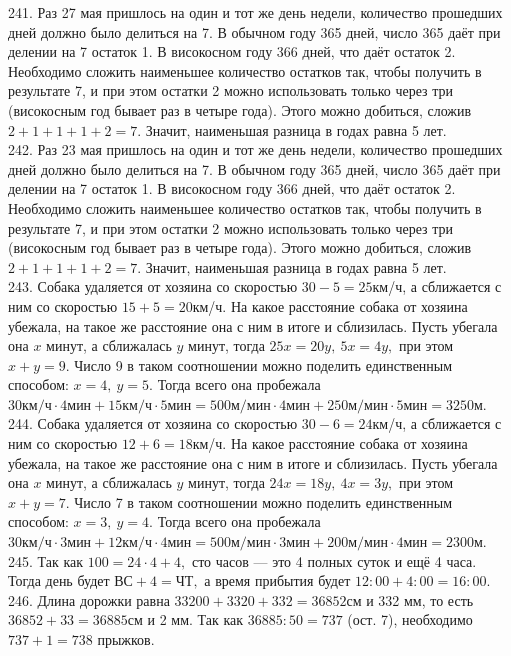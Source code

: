 \documentclass[12pt]{article}
\begin{document}
241. Раз 27 мая пришлось на один и тот же день недели, количество прошедших дней должно было делиться на 7. В обычном году 365 дней, число 365 даёт при делении на 7 остаток 1. В високосном году 366 дней, что даёт остаток 2. Необходимо сложить наименьшее количество остатков так, чтобы получить в результате 7, и при этом остатки 2 можно использовать только через три (високосным год бывает раз в четыре года). Этого можно добиться, сложив $2+1+1+1+2=7.$ Значит, наименьшая разница в годах равна 5 лет. \\
242. Раз 23 мая пришлось на один и тот же день недели, количество прошедших дней должно было делиться на 7. В обычном году 365 дней, число 365 даёт при делении на 7 остаток 1. В високосном году 366 дней, что даёт остаток 2. Необходимо сложить наименьшее количество остатков так, чтобы получить в результате 7, и при этом остатки 2 можно использовать только через три (високосным год бывает раз в четыре года). Этого можно добиться, сложив $2+1+1+1+2=7.$ Значит, наименьшая разница в годах равна 5 лет.\\
243. Собака удаляется от хозяина со скоростью $30-5=25$км/ч, а сближается с ним со скоростью $15+5=20$км/ч. На какое расстояние собака от хозяина убежала, на такое же расстояние она с ним в итоге и сблизилась. Пусть убегала она $x$ минут, а сближалась $y$ минут, тогда $25x=20y,\ 5x=4y,$ при этом $x+y=9.$ Число 9 в таком соотношении можно поделить единственным способом: $x=4,\ y=5.$ Тогда всего она пробежала $30\text{км/ч}\cdot4\text{мин}+15\text{км/ч}\cdot5\text{мин}=500\text{м/мин}\cdot4\text{мин}+
250\text{м/мин}\cdot5\text{мин}=3250$м.\\
244. Собака удаляется от хозяина со скоростью $30-6=24$км/ч, а сближается с ним со скоростью $12+6=18$км/ч. На какое расстояние собака от хозяина убежала, на такое же расстояние она с ним в итоге и сблизилась. Пусть убегала она $x$ минут, а сближалась $y$ минут, тогда $24x=18y,\ 4x=3y,$ при этом $x+y=7.$ Число 7 в таком соотношении можно поделить единственным способом: $x=3,\ y=4.$ Тогда всего она пробежала $30\text{км/ч}\cdot3\text{мин}+12\text{км/ч}\cdot4\text{мин}=500\text{м/мин}\cdot3\text{мин}+
200\text{м/мин}\cdot4\text{мин}=2300$м.\\
245. Так как $100=24\cdot4+4,$ сто часов --- это 4 полных суток и ещё 4 часа. Тогда день будет $\text{ВС}+4=\text{ЧТ},$ а время прибытия будет $12:00+4:00=16:00.$\\
246. Длина дорожки равна $33200+3320+332=36852$см и 332 мм, то есть $36852+33=36885$см и 2 мм. Так как $36885:50=737$ (ост. 7), необходимо $737+1=738$ прыжков.\\
\end{document}
